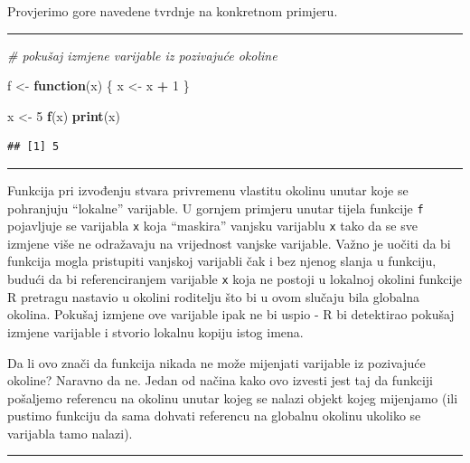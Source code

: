 \documentclass[]{book}
\newenvironment{Shaded}{\begin{snugshade}}{\end{snugshade}}
\newcommand{\KeywordTok}[1]{\textcolor[rgb]{0.13,0.29,0.53}{\textbf{#1}}}
\newcommand{\DecValTok}[1]{\textcolor[rgb]{0.00,0.00,0.81}{#1}}
\newcommand{\StringTok}[1]{\textcolor[rgb]{0.31,0.60,0.02}{#1}}
\newcommand{\CommentTok}[1]{\textcolor[rgb]{0.56,0.35,0.01}{\textit{#1}}}
\newcommand{\ControlFlowTok}[1]{\textcolor[rgb]{0.13,0.29,0.53}{\textbf{#1}}}
\newcommand{\OperatorTok}[1]{\textcolor[rgb]{0.81,0.36,0.00}{\textbf{#1}}}
\newcommand{\NormalTok}[1]{#1}
\theoremstyle{definition}
\theoremstyle{definition}
\theoremstyle{definition}
\theoremstyle{remark}
\begin{document}
Provjerimo gore navedene tvrdnje na konkretnom primjeru.

\begin{center}\rule{0.5\linewidth}{\linethickness}\end{center}

\begin{Shaded}
\begin{Highlighting}[]
\CommentTok{# pokušaj izmjene varijable iz pozivajuće okoline}

\NormalTok{f <-}\StringTok{ }\ControlFlowTok{function}\NormalTok{(x) \{}
\NormalTok{    x <-}\StringTok{ }\NormalTok{x }\OperatorTok{+}\StringTok{ }\DecValTok{1}
\NormalTok{\}}

\NormalTok{x <-}\StringTok{ }\DecValTok{5}
\KeywordTok{f}\NormalTok{(x)}
\KeywordTok{print}\NormalTok{(x)}
\end{Highlighting}
\end{Shaded}

\begin{verbatim}
## [1] 5
\end{verbatim}

\begin{center}\rule{0.5\linewidth}{\linethickness}\end{center}

Funkcija pri izvođenju stvara privremenu vlastitu okolinu unutar koje se
pohranjuju ``lokalne'' varijable. U gornjem primjeru unutar tijela
funkcije \texttt{f} pojavljuje se varijabla \texttt{x} koja ``maskira''
vanjsku varijablu \texttt{x} tako da se sve izmjene više ne odražavaju
na vrijednost vanjske varijable. Važno je uočiti da bi funkcija mogla
pristupiti vanjskoj varijabli čak i bez njenog slanja u funkciju, budući
da bi referenciranjem varijable \texttt{x} koja ne postoji u lokalnoj
okolini funkcije R pretragu nastavio u okolini roditelju što bi u ovom
slučaju bila globalna okolina. Pokušaj izmjene ove varijable ipak ne bi
uspio - R bi detektirao pokušaj izmjene varijable i stvorio lokalnu
kopiju istog imena.

Da li ovo znači da funkcija nikada ne može mijenjati varijable iz
pozivajuće okoline? Naravno da ne. Jedan od načina kako ovo izvesti jest
taj da funkciji pošaljemo referencu na okolinu unutar kojeg se nalazi
objekt kojeg mijenjamo (ili pustimo funkciju da sama dohvati referencu
na globalnu okolinu ukoliko se varijabla tamo nalazi).

\begin{center}\rule{0.5\linewidth}{\linethickness}\end{center}
\end{document}
